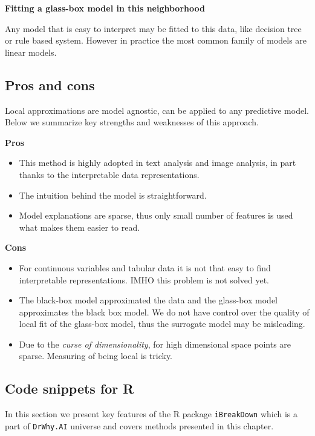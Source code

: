 \documentclass[12pt,]{krantz}
\providecommand{\tightlist}{%
  \setlength{\itemsep}{0pt}\setlength{\parskip}{0pt}}
\theoremstyle{definition}
\theoremstyle{definition}
\theoremstyle{definition}
\theoremstyle{remark}
\begin{document}
\textbf{Fitting a glass-box model in this neighborhood}

Any model that is easy to interpret may be fitted to this data, like
decision tree or rule based system. However in practice the most common
family of models are linear models.

\hypertarget{pros-and-cons-3}{%
\subsection{Pros and cons}\label{pros-and-cons-3}}

Local approximations are model agnostic, can be applied to any
predictive model. Below we summarize key strengths and weaknesses of
this approach.

\textbf{Pros}

\begin{itemize}
\tightlist
\item
  This method is highly adopted in text analysis and image analysis, in
  part thanks to the interpretable data representations.
\item
  The intuition behind the model is straightforward.
\item
  Model explanations are sparse, thus only small number of features is
  used what makes them easier to read.
\end{itemize}

\textbf{Cons}

\begin{itemize}
\tightlist
\item
  For continuous variables and tabular data it is not that easy to find
  interpretable representations. IMHO this problem is not solved yet.
\item
  The black-box model approximated the data and the glass-box model
  approximates the black box model. We do not have control over the
  quality of local fit of the glass-box model, thus the surrogate model
  may be misleading.
\item
  Due to the \emph{curse of dimensionality}, for high dimensional space
  points are sparse. Measuring of being local is tricky.
\end{itemize}

\hypertarget{code-snippets-for-r-3}{%
\subsection{Code snippets for R}\label{code-snippets-for-r-3}}

In this section we present key features of the R package
\texttt{iBreakDown} \citep{iBreakDownRPackage} which is a part of
\texttt{DrWhy.AI} universe and covers methods presented in this chapter.
\end{document}
